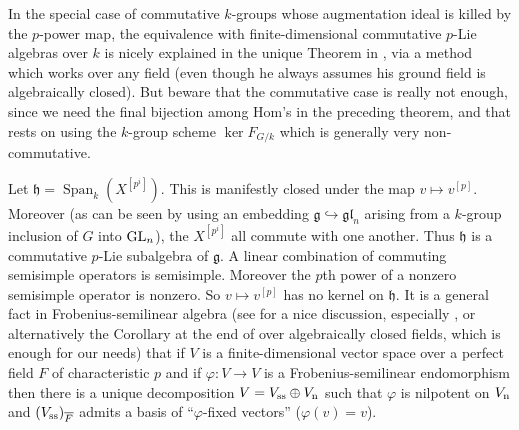 \documentclass[10pt]{article}
\renewcommand{\phi}{\varphi}
\renewcommand{\(}{\left(}
\renewcommand{\)}{\right)}
\numberwithin{thm}{subsection}
\begin{document}
\begin{remark} In the special case of commutative $k$-groups whose augmentation ideal
is killed by the $p$-power map, the equivalence with finite-dimensional commutative $p$-Lie algebras 
over $k$ is nicely explained in the unique Theorem in \cite[\S14]{mumford}, via a method 
which works over any field (even though he always assumes his ground field is algebraically closed).
But beware that the commutative case is really not enough, since we need the final
bijection among Hom's in the preceding theorem, and that rests on using the $k$-group scheme
$\ker F_{G/k}$ which is generally very non-commutative.
\end{remark}


Let $\mathfrak{h}=\operatorname{Span}_k(X^{[p^i]})$.
This is manifestly closed under the map $v\mapsto v^{[p]}$.
Moreover (as can be seen by using an 
embedding $\mathfrak{g}\hookrightarrow\mathfrak{gl}_n$ arising from a $k$-group inclusion of
$G$ into ${\rm{GL}}_n$), the $X^{[p^i]}$ all commute with one another.
Thus $\mathfrak{h}$ is a commutative $p$-Lie subalgebra of $\mathfrak{g}$.
A linear combination of commuting semisimple operators
is semisimple. Moreover the $p$th power of a nonzero semisimple operator
is nonzero. So $v\mapsto v^{[p]}$ has no kernel on $\mathfrak{h}$.
It is a general fact in Frobenius-semilinear algebra (see \cite[XXII, \S1]{sga7}
for a nice discussion, especially \cite[(1.0.9), Prop.\,1.1]{sga7}, or alternatively
the Corollary at the end of \cite[\S14]{mumford}
over algebraically closed fields, which is enough for our needs) that 
if $V$ is a finite-dimensional vector space
over a perfect field $F$ of characteristic $p$ and if $\phi:V \rightarrow V$ is
a Frobenius-semilinear endomorphism then there is a unique decomposition
$V = V_{\rm{ss}} \oplus V_{\rm{n}}$ such that
$\phi$ is nilpotent on $V_{\rm{n}}$ and $(V_{\rm{ss}})_{\overline{F}}$ admits a basis 
of ``$\phi$-fixed vectors'' ($\phi(v) = v$). 
\end{document}
